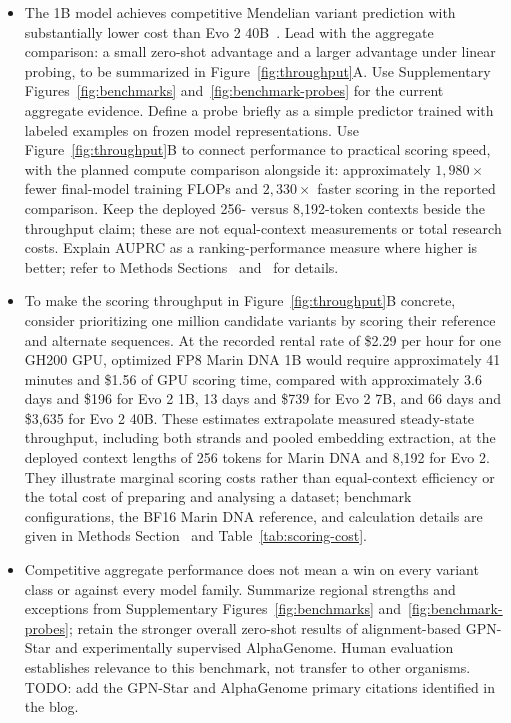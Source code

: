 \documentclass[a4paper,num-refs]{oup-contemporary}
\begin{document}
\begin{itemize}
\item The 1B model achieves competitive Mendelian variant prediction with
substantially lower cost than Evo 2 40B~\citep{brixi2026evo2}. Lead with the
aggregate comparison: a small zero-shot advantage and a larger advantage
under linear probing, to be summarized in Figure~\ref{fig:throughput}A.
Use Supplementary Figures~\ref{fig:benchmarks} and~\ref{fig:benchmark-probes}
for the current aggregate evidence. Define a probe briefly as a simple predictor
trained
with labeled examples on frozen model representations. Use
Figure~\ref{fig:throughput}B to connect performance to practical scoring speed,
with the planned compute comparison alongside it: approximately
$1{,}980\times$ fewer final-model training FLOPs and
$2{,}330\times$ faster scoring in the reported comparison. Keep the deployed
256- versus 8,192-token contexts beside the throughput claim; these are not
equal-context measurements or total research costs. Explain AUPRC as a
ranking-performance measure where higher is better; refer to Methods
Sections~ and~ for
details.
\item To make the scoring throughput in Figure~\ref{fig:throughput}B concrete,
consider prioritizing one million candidate variants by scoring their reference
and alternate sequences.
At the recorded rental rate of \$2.29 per hour for one GH200 GPU, optimized FP8
Marin DNA 1B would require approximately 41 minutes and \$1.56 of GPU scoring
time, compared with approximately 3.6 days and \$196 for Evo 2 1B, 13 days and
\$739 for Evo 2 7B, and 66 days and \$3,635 for Evo 2 40B.
These estimates extrapolate measured steady-state throughput, including both
strands and pooled embedding extraction, at the deployed context lengths of 256
tokens for Marin DNA and 8,192 for Evo 2.
They illustrate marginal scoring costs rather than equal-context efficiency or
the total cost of preparing and analysing a dataset; benchmark configurations,
the BF16 Marin DNA reference, and calculation details are given in Methods
Section~ and Table~\ref{tab:scoring-cost}.
\item Competitive aggregate performance does not mean a win on every variant
class or against every model family. Summarize regional strengths and
exceptions from Supplementary Figures~\ref{fig:benchmarks}
and~\ref{fig:benchmark-probes}; retain the stronger overall zero-shot results
of alignment-based GPN-Star and experimentally supervised AlphaGenome.
Human evaluation establishes relevance to this benchmark, not transfer to
other organisms. TODO: add the GPN-Star and AlphaGenome primary citations
identified in the blog.

\end{itemize}
\end{document}
